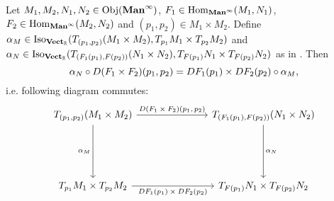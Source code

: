 \documentclass{book}
\begin{document}
	\begin{ex} 
		Let $M_1, M_2, N_1, N_2 \in \operatorname{Obj}(\operatorname*{\text{\textbf{Man}}^{\infty}})$, $F_1 \in \operatorname{Hom}_{\operatorname*{\text{\textbf{Man}}^{\infty}}}(M_1, N_1)$, $F_2 \in \operatorname{Hom}_{\operatorname*{\text{\textbf{Man}}^{\infty}}}(M_2, N_2)$ and $(p_1, p_2) \in M_1 \times M_2$. Define $\alpha_M \in \operatorname{Iso}_{\operatorname*{\text{\textbf{Vect}}_{\mathbb{R}}}}(T_{(p_1, p_2)}(M_1 \times M_2), T_{p_1}M_1 \times T_{p_2}M_2)$ and $\alpha_N \in \operatorname{Iso}_{\operatorname*{\text{\textbf{Vect}}_{\mathbb{R}}}}(T_{(F_1(p_1), F(p_2))}(N_1 \times N_2), T_{F(p_1)}N_1 \times T_{F(p_2)}N_2)$ as in . Then 
		$$\alpha_N \circ D(F_1 \times F_2)(p_1, p_2) = DF_1(p_1) \times DF_2(p_2) \circ \alpha_M,$$ i.e. following diagram commutes: 
		\[ 
		\begin{tikzcd}
			\text{$T_{(p_1, p_2)}(M_1 \times M_2)$} \arrow[ddd, "\al_M"'] \arrow[rrr, "\text{$D(F_1 \times F_2)(p_1, p_2)$}"] &&&  \text{$T_{(F_1(p_1), F(p_2))}(N_1 \times N_2)$} \arrow[ddd, "\al_N"] \\
			& \\
			& \\
			\text{$T_{p_1}M_1 \times T_{p_2}M_2$} \arrow[rrr, "\text{$DF_1(p_1) \times DF_2(p_2)$}"'] &&&  \text{$T_{F(p_1)}N_1 \times T_{F(p_2)}N_2$}
		\end{tikzcd}
		\] 
	\end{ex}
\end{document}
